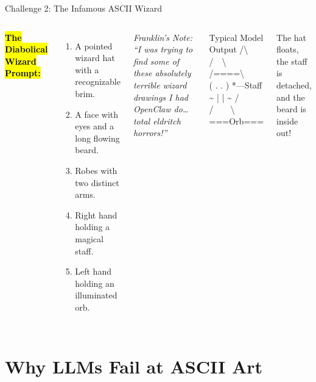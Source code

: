 \documentclass[12pt]{beamer}
\begin{document}
\begin{frame}{Challenge 2: The Infamous ASCII Wizard}
  \begin{columns}[T]
      \textbf{\hl{The Diabolical Wizard Prompt:}}
      \begin{enumerate}
        \item A pointed wizard hat with a recognizable brim.
        \item A face with eyes and a long flowing beard.
        \item Robes with two distinct arms.
        \item Right hand holding a magical staff.
        \item Left hand holding an illuminated orb.
      \end{enumerate}

      \vspace{0.2cm}
      \footnotesize\textcolor{bulletcolor}{\textit{Franklin's Note: ``I was trying to find some of these absolutely terrible wizard drawings I had OpenClaw do\dots{} total eldritch horrors!''}}

      \begin{exampleblock}{Typical Model Output}
        \ttfamily\tiny
        \quad /\textbackslash \\
        \quad /~~\textbackslash \\
        \quad /====\textbackslash \\
        \quad ( . . )  *---Staff \\
        \quad \textasciitilde{} | | \textasciitilde{} / \\
        \quad /~~\textbar{}~~\textbackslash \\
        \quad ===Orb===
      \end{exampleblock}
      \vspace{0.1cm}
      \footnotesize The hat floats, the staff is detached, and the beard is inside out!
  \end{columns}
\end{frame}

\section{Why LLMs Fail at ASCII Art}
\end{document}
